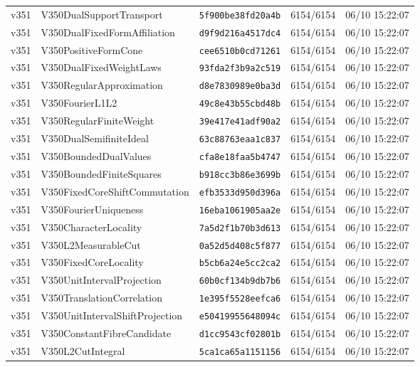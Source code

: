 \documentclass[11pt]{article}
\theoremstyle{definition}\newtheorem{deriv}{Derivação}
\begin{document}
{\begin{longtable}{@{}lllll@{}}
v351 & V350DualSupportTransport & \texttt{5f900be38fd20a4b} & 6154/6154 & 06/10 15:22:07 \\
v351 & V350DualFixedFormAffiliation & \texttt{d9f9d216a4517dc4} & 6154/6154 & 06/10 15:22:07 \\
v351 & V350PositiveFormCone & \texttt{cee6510b0cd71261} & 6154/6154 & 06/10 15:22:07 \\
v351 & V350DualFixedWeightLaws & \texttt{93fda2f3b9a2c519} & 6154/6154 & 06/10 15:22:07 \\
v351 & V350RegularApproximation & \texttt{d8e7830989e0ba3d} & 6154/6154 & 06/10 15:22:07 \\
v351 & V350FourierL1L2 & \texttt{49c8e43b55cbd48b} & 6154/6154 & 06/10 15:22:07 \\
v351 & V350RegularFiniteWeight & \texttt{39e417e41adf90a2} & 6154/6154 & 06/10 15:22:07 \\
v351 & V350DualSemifiniteIdeal & \texttt{63c88763eaa1c837} & 6154/6154 & 06/10 15:22:07 \\
v351 & V350BoundedDualValues & \texttt{cfa8e18faa5b4747} & 6154/6154 & 06/10 15:22:07 \\
v351 & V350BoundedFiniteSquares & \texttt{b918cc3b86e3699b} & 6154/6154 & 06/10 15:22:07 \\
v351 & V350FixedCoreShiftCommutation & \texttt{efb3533d950d396a} & 6154/6154 & 06/10 15:22:07 \\
v351 & V350FourierUniqueness & \texttt{16eba1061905aa2e} & 6154/6154 & 06/10 15:22:07 \\
v351 & V350CharacterLocality & \texttt{7a5d2f1b70b3d613} & 6154/6154 & 06/10 15:22:07 \\
v351 & V350L2MeasurableCut & \texttt{0a52d5d408c5f877} & 6154/6154 & 06/10 15:22:07 \\
v351 & V350FixedCoreLocality & \texttt{b5cb6a24e5cc2ca2} & 6154/6154 & 06/10 15:22:07 \\
v351 & V350UnitIntervalProjection & \texttt{60b0cf134b9db7b6} & 6154/6154 & 06/10 15:22:07 \\
v351 & V350TranslationCorrelation & \texttt{1e395f5528eefca6} & 6154/6154 & 06/10 15:22:07 \\
v351 & V350UnitIntervalShiftProjection & \texttt{e50419955648094c} & 6154/6154 & 06/10 15:22:07 \\
v351 & V350ConstantFibreCandidate & \texttt{d1cc9543cf02801b} & 6154/6154 & 06/10 15:22:07 \\
v351 & V350L2CutIntegral & \texttt{5ca1ca65a1151156} & 6154/6154 & 06/10 15:22:07 \\

\end{longtable}}
\end{document}
